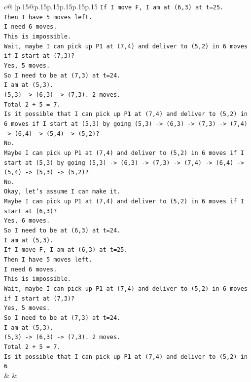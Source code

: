 \documentclass{article}
\begin{document}
{\begin{supertabular}{c@{$\;$}|p{.15\linewidth}@{}p{.15\linewidth}p{.15\linewidth}p{.15\linewidth}p{.15\linewidth}p{.15\linewidth}}
{{{\texttt{If I move F, I am at (6,3) at t=25.} \\
\texttt{Then I have 5 moves left.} \\
\texttt{I need 6 moves.} \\
\texttt{This is impossible.} \\
\texttt{Wait, maybe I can pick up P1 at (7,4) and deliver to (5,2) in 6 moves if I start at (7,3)?} \\
\texttt{Yes, 5 moves.} \\
\texttt{So I need to be at (7,3) at t=24.} \\
\texttt{I am at (5,3).} \\
\texttt{(5,3) {-}> (6,3) {-}> (7,3). 2 moves.} \\
\texttt{Total 2 + 5 = 7.} \\
\texttt{Is it possible that I can pick up P1 at (7,4) and deliver to (5,2) in 6 moves if I start at (5,3) by going (5,3) {-}> (6,3) {-}> (7,3) {-}> (7,4) {-}> (6,4) {-}> (5,4) {-}> (5,2)?} \\
\texttt{No.} \\
\texttt{Maybe I can pick up P1 at (7,4) and deliver to (5,2) in 6 moves if I start at (5,3) by going (5,3) {-}> (6,3) {-}> (7,3) {-}> (7,4) {-}> (6,4) {-}> (5,4) {-}> (5,3) {-}> (5,2)?} \\
\texttt{No.} \\
\texttt{Okay, let's assume I can make it.} \\
\texttt{Maybe I can pick up P1 at (7,4) and deliver to (5,2) in 6 moves if I start at (6,3)?} \\
\texttt{Yes, 6 moves.} \\
\texttt{So I need to be at (6,3) at t=24.} \\
\texttt{I am at (5,3).} \\
\texttt{If I move F, I am at (6,3) at t=25.} \\
\texttt{Then I have 5 moves left.} \\
\texttt{I need 6 moves.} \\
\texttt{This is impossible.} \\
\texttt{Wait, maybe I can pick up P1 at (7,4) and deliver to (5,2) in 6 moves if I start at (7,3)?} \\
\texttt{Yes, 5 moves.} \\
\texttt{So I need to be at (7,3) at t=24.} \\
\texttt{I am at (5,3).} \\
\texttt{(5,3) {-}> (6,3) {-}> (7,3). 2 moves.} \\
\texttt{Total 2 + 5 = 7.} \\
\texttt{Is it possible that I can pick up P1 at (7,4) and deliver to (5,2) in 6} \\
            }
        }
    }
    & & \\ \\


\end{supertabular}}
\end{document}
